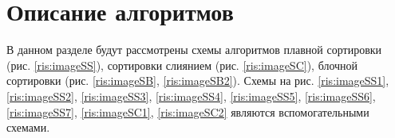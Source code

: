 \section{Описание алгоритмов}
В данном разделе будут рассмотрены схемы алгоритмов плавной сортировки (рис. \ref{ris:imageSS}), сортировки слиянием (рис. \ref{ris:imageSC}), блочной сортировки (рис. \ref{ris:imageSB}, \ref{ris:imageSB2}). Схемы на рис. \ref{ris:imageSS1}, \ref{ris:imageSS2}, \ref{ris:imageSS3}, \ref{ris:imageSS4}, \ref{ris:imageSS5}, \ref{ris:imageSS6}, \ref{ris:imageSS7}, \ref{ris:imageSC1}, \ref{ris:imageSC2} являются вспомогательными схемами. 
\begin{center}
	

\newpage
	\centering
	\def\svgwidth{9cm}
	
	\label{ris:imageSS}
\newpage
	\centering
	\def\svgwidth{8cm}
	
	\label{ris:imageSS1}
\newpage
	\centering
	\def\svgwidth{12cm}
	
	\label{ris:imageSS2}
\newpage
	\centering
		\def\svgwidth{12cm}
	
	\label{ris:imageSS3}
\newpage
	\centering
	\def\svgwidth{14cm}
	
	\label{ris:imageSS4}
\newpage
	\centering
	\def\svgwidth{15cm}
	

\end{center}
